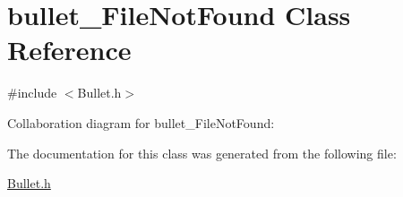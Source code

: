 \hypertarget{classbullet___file_not_found}{}\section{bullet\+\_\+\+File\+Not\+Found Class Reference}
\label{classbullet___file_not_found}


{\ttfamily \#include $<$Bullet.\+h$>$}



Collaboration diagram for bullet\+\_\+\+File\+Not\+Found\+:


The documentation for this class was generated from the following file\+:\begin{DoxyCompactItemize}
\item 
\hyperlink{_bullet_8h}{Bullet.\+h}\end{DoxyCompactItemize}
